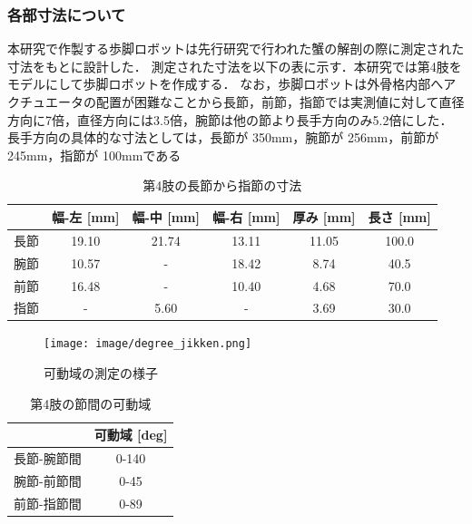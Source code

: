 \subsubsection{各部寸法について}
本研究で作製する歩脚ロボットは先行研究で行われた蟹の解剖の際に測定された寸法をもとに設計した．
測定された寸法を以下の表に示す．本研究では第4肢をモデルにして歩脚ロボットを作成する．
なお，歩脚ロボットは外骨格内部へアクチュエータの配置が困難なことから長節，前節，指節では実測値に対して直径方向に7倍，直径方向には3.5倍，腕節は他の節より長手方向のみ5.2倍にした．
長手方向の具体的な寸法としては，長節が 350mm，腕節が 256mm，前節が 245mm，指節が 100mmである
\begin{table}[h]
  \centering
  \caption{第4肢の長節から指節の寸法}
  \label{tab:4setu}
  \vspace{-3mm}
  \begin{tabular}{|l|c|c|c|c|c|}
  \hline
     & \multicolumn{1}{l|}{幅-左 [mm]} & \multicolumn{1}{l|}{幅-中 [mm]} & \multicolumn{1}{l|}{幅-右 [mm]} & \multicolumn{1}{l|}{厚み [mm]} & \multicolumn{1}{l|}{長さ [mm]} \\ \hline
  長節 & 19.10                       & 21.74                       & 13.11                       & 11.05                       & 100.0                       \\ \hline
  腕節 & 10.57                       & -                           & 18.42                       & 8.74                        & 40.5                        \\ \hline
  前節 & 16.48                       & -                           & 10.40                       & 4.68                        & 70.0                        \\ \hline
  指節 & -                           & 5.60                        & -                           & 3.69                        & 30.0                        \\ \hline
  \end{tabular}
\end{table}
\begin{figure}
  \centering
  \texttt{[image: image/degree\_jikken.png]}
  \caption{可動域の測定の様子}
  \label{fig:sokutei}
\end{figure}
\begin{table}[!t]
  \centering
  \vspace{5mm}
  \caption{第4肢の節間の可動域}
  \label{tab:4setukadou}
  \vspace{-3mm}
  \begin{tabular}{|l|c|}
  \hline
         & \multicolumn{1}{l|}{可動域 {[}deg{]}} \\ \hline
  長節-腕節間 & 0-140                            \\ \hline
  腕節-前節間 & 0-45                             \\ \hline
  前節-指節間 & 0-89                            \\ \hline
  \end{tabular}
\end{table}

